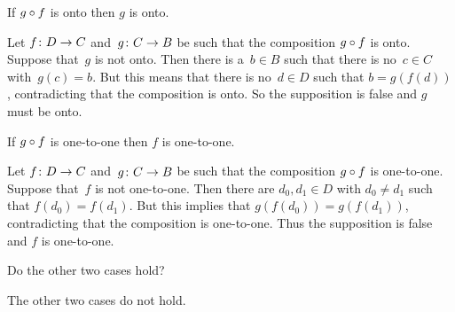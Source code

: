\documentclass{ibl}  %
\begin{document}
\begin{problem}
\begin{exes}

\begin{exercise} 
  If $g\mathbin{\circ} f$ is onto then $g$ is onto.
\end{exercise}
\begin{answer}
  Let $\mbox{$f\colon D\to C$}$ and~$\mbox{$g\colon C\to B$}$ be such that 
  the composition $g\mathbin{\circ} f$ is onto.
  Suppose that~$g$ is not onto.
  Then there is a~$b\in B$ such that there is no~$c\in C$
  with~$g(c)=b$.
  But this means that there is no~$d\in D$ such that 
  $b=g(f(d))$, contradicting that the composition is onto.
  So the supposition is false and $g$ must be onto.  
\end{answer}
\begin{exercise} 
  If $g\mathbin{\circ} f$ is one-to-one then $f$ is one-to-one.
\end{exercise}
\begin{answer}
  Let $\mbox{$f\colon D\to C$}$ and~$\mbox{$g\colon C\to B$}$ be such that 
  the composition $g\mathbin{\circ} f$ is one-to-one.
  Suppose that~$f$ is not one-to-one.
  Then there are $d_0,d_1\in D$ with $d_0\neq d_1$ such that $f(d_0)=f(d_1)$.
  But this implies that $g(f(d_0))=g(f(d_1))$, contradicting that 
  the composition is one-to-one.
  Thus the supposition is false and $f$ is one-to-one.  
\end{answer}
\begin{exercise}[\maxlength] 
  Do the other two cases hold? 
\end{exercise}
\begin{answer}
  The other two cases do not hold.
  

\end{answer}
\end{exes}
\end{problem}
\end{document}
